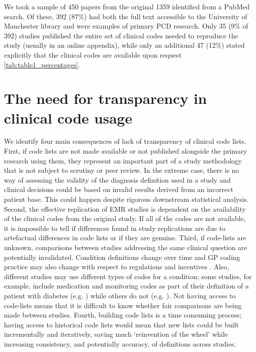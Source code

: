 \documentclass[10pt]{article}
\begin{document}
We took a sample of 450 papers from the original 1359 identified from a PubMed search.  Of these, 392 (87\%) had both  the full text accessible to the University of Manchester library and were examples of primary PCD research.  Only 35 (9\% of 392) studies published the entire set of clinical codes needed to reproduce the study (usually in an online appendix), while only an additional 47 (12\%) stated explicitly that the clinical codes are available upon request \ref{tab:table1_percentages}.


\section*{The need for transparency in clinical code usage}


We identify four main consequences of lack of transparency of clinical code lists.  First, if code lists are not made available or not published alongside the primary research using them, they represent an important part of a study methodology that is not subject to scrutiny or peer review. In the extreme case, there is no way of assessing the validity of the diagnosis definition used in a study and clinical decisions could be based on invalid results derived from an incorrect patient base.  This could happen despite rigorous downstream statistical analysis.  Second, the effective replication of EMR studies is dependent on the availability of the clinical codes from the original study.  If all of the codes are not available, it is impossible to tell if differences found in study replications are due to artefactual differences in code lists or if they are genuine.  Third, if code-lists are unknown, comparisons between studies addressing the same clinical question are potentially invalidated.  Condition definitions change over time and GP coding practice may also change with respect to regulations and incentives \cite{Hippisley-Cox2006}. Also, different studies may use different types of codes for a condition; some studies, for example, include medication and monitoring codes as part of their definition of a patient with diabetes (e.g. \cite{Mulnier2006}) while others do not (e.g. \cite{Kontopantelis2014}).  Not having access to code-lists means that it is difficult to know whether fair comparisons are being made between studies. Fourth, building code lists is a time consuming process; having access to historical code lists  would mean that new lists could be built incrementally and iteratively, saving much `reinvention of the wheel' while increasing consistency, and potentially accuracy, of definitions across studies.
\end{document}
